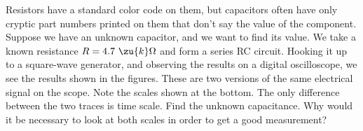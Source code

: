 Resistors have a standard color code on them, but capacitors often
have only cryptic part numbers printed on them that don't say the
value of the component. Suppose we have an unknown capacitor, and we
want to find its value. We take a known resistance $R=4.7\
\zu{k}\Omega$ and form a series RC circuit. Hooking it up to a
square-wave generator, and observing the results on a digital
oscilloscope, we see the results shown in the figures. These are two
versions of the same electrical signal on the scope.  Note the scales
shown at the bottom. The only difference between the two traces is
time scale. Find the unknown capacitance. Why would it be necessary to
look at both scales in order to get a good measurement?\answercheck
